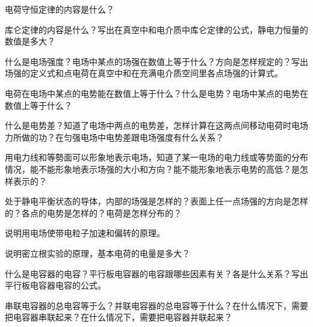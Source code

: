 \begin{Review}
\begin{question}
	\item 电荷守恒定律的内容是什么？
	\item 库仑定律的内容是什么？写出在真空中和电介质中库仑定律的公式，静电力恒量的数值是多大？
	\item 什么是电场强度？电场中某点的场强在数值上等于什么？方向是怎样规定的？写出场强的定义式和点电荷在真空中和在充满电介质空间里各点场强的计算式。
	\item 电荷在电场中某点的电势能在数值上等于什么？什么是电势？电场中某点的电势在数值上等于什么？
	\item 什么是电势差？知道了电场中两点的电势差，怎样计算在这两点间移动电荷时电场力所做的功？在匀强电场中电势差跟电场强度有什么关系？
	\item 用电力线和等勢面可以形象地表示电场，知道了某一电场的电力线或等势面的分布情况，能不能形象地表示场强的大小和方向？能不能形象地表示电势的高低？是怎样表示的？
	\item 处于静电平衡状态的导体，内部的场强是怎样的？表面上任一点场强的方向是怎样的？各点的电势是怎样的？电荷是怎样分布的？
	\item 说明用电场使带电粒子加速和偏转的原理。
	\item 说明密立根实验的原理，基本电荷的电量是多大？
	\item 什么是电容器的电容？平行板电容器的电容跟哪些因素有关？各是什么关系？写出平行板电容器电容的公式。
	\item 串联电容器的总电容等于么？并联电容器的总电容等于什么？在什么情况下，需要把电容器串联起来？在什么情况下，需要把电容器并联起来？
\end{question}
\end{Review}

